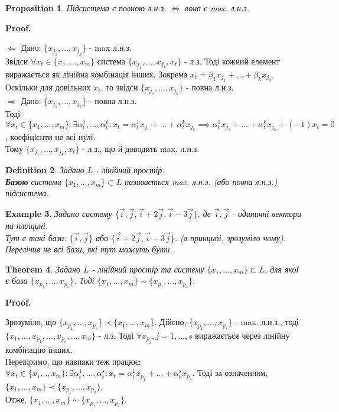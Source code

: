 \documentclass[a4paper, 10pt]{article}
\makeatletter
\def\qed{$\blacksquare$}
\def\rightproof{$\boxed{\Rightarrow}$ }
\def\leftproof{$\boxed{\Leftarrow}$ }
\theoremstyle{theoremdd}
\newtheorem{theorem}{Theorem}[subsection]
\theoremstyle{theoremdd}
\newtheorem{definition}[theorem]{Definition}
\theoremstyle{theoremdd}
\theoremstyle{theoremdd}
\newtheorem{example}[theorem]{Example}
\theoremstyle{theoremdd}
\newtheorem{proposition}[theorem]{Proposition}
\theoremstyle{theoremdd}
\theoremstyle{theoremdd}
\theoremstyle{theoremdd}
\renewenvironment{proof}[1][Proof.\\]{\par
\pushQED{\hfill \qed}%
\normalfont \topsep6\p@\@plus6\p@\relax
\trivlist
\item\relax
{\bfseries
#1\@addpunct{.}}\hspace\labelsep\ignorespaces
}{%
\popQED\endtrivlist\@endpefalse
}
\makeatother
\begin{document}
	\begin{proposition}
	Підсистема є повною л.н.з. $\iff$ вона є max. л.н.з.
	\end{proposition}
	
	\begin{proof}
	\leftproof Дано: $\{x_{j_1}, \dots, x_{j_k}\}$ - max л.н.з.\\
	Звідси $\forall x_t \in \{x_1, \dots, x_m \}$ система $\{x_{j_1}, \dots, x_{j_k}, x_t\}$ - л.з. Тоді кожний елемент виражається як лінійна комбінація інших. Зокрема $x_t = \beta_1 x_{j_1} + \dots + \beta_k x_{j_k}$.\\
	Оскільки для довільних $x_t$, то звідси $\{x_{j_1},\dots, x_{j_k}\}$ - повна л.н.з.
	\bigskip \\
	\rightproof Дано: $\{x_{j_1}, \dots, x_{j_k}\}$ - повна л.н.з.\\
	Тоді $\forall x_t \in \{x_1, \dots, x_m\}: \exists \alpha^1_t, \dots, \alpha^k_t: x_t = \alpha^1_t x_{j_1} + \dots + \alpha^k_t x_{j_k} \implies \alpha^1_t x_{j_1} + \dots + \alpha^k_t x_{j_k} + (-1)x_t = 0$, коефіцієнти не всі нулі.\\
	Тому $\{x_{j_1}, \dots, x_{j_k}, x_t\}$ - л.з., що й доводить max. л.н.з.
	\end{proof}
	
	\begin{definition}
	Задано $L$ - лінійний простір.\\
	\textbf{Базою} системи $\{x_1, \dots, x_m\} \subset L$ називається max. л.н.з. (або повна л.н.з.) підсистема.
	\end{definition}
	
	\begin{example}
	Задано систему $\{\vec{i}, \vec{j}, \vec{i}+2\vec{j}, \vec{i}-3\vec{j} \}$, де $\vec{i},\vec{j}$ - одиничні вектори на площині.\\
	Тут є такі бази: $\{\vec{i},\vec{j}\}$ або $\{\vec{i}+2\vec{j},\vec{i}-3\vec{j}\}$. (в принципі, зрозуміло чому). Перелічив не всі бази, які тут можуть бути.
	\end{example}
	
	\begin{theorem}
	Задано $L$ - лінійний простір та систему $\{x_1, \dots, x_m\} \subset L$, для якої є база $\{x_{p_1}, \dots, x_{p_s}\}$. Тоді $\{x_1, \dots, x_m\} \sim \{x_{p_1}, \dots, x_{p_s}\}$.
	\end{theorem}
	
	\begin{proof}
	Зрозуміло, що $\{x_{p_1}, \dots, x_{p_s} \} \prec \{x_1, \dots, x_m \}$. Дійсно, $\{x_{p_1}, \dots, x_{p_s}\}$ - max. л.н.з., тоді $\{x_1,\dots,x_{p_1},\dots,x_{p_s},\dots,x_m\}$ - л.з. Тоді $\forall x_{p_j}, j=1,\dots,s$ виражається через лінійну комбінацію інших.\\
	Перевіримо, що навпаки теж працює:\\
	$\forall x_t \in \{x_1 \dots, x_m\}: \exists \alpha^1_t, \dots, \alpha^s_t: x_t = \alpha^1_t x_{p_1} + \dots + \alpha^s_t x_{p_s}$. Тоді за означенням, $\{x_1, \dots, x_m \} \prec \{x_{p_1}, \dots, x_{p_s} \}$.\\
	Отже, $\{x_1, \dots, x_m \} \sim \{x_{p_1}, \dots, x_{p_s} \}$.
	\end{proof}
	
\end{document}
